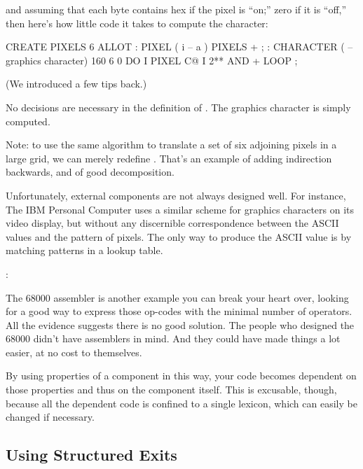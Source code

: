 \noindent and assuming that each byte contains hex  if the pixel is
``on;'' zero if it is ``off,'' then here's how little code it takes to
compute the character:

\begin{Code}
CREATE PIXELS  6 ALLOT
: PIXEL  ( i -- a )  PIXELS + ;
: CHARACTER  ( -- graphics character)
   160   6 0 DO  I PIXEL C@  I 2** AND  +  LOOP ;
\end{Code}
(We introduced  a few tips back.)

No decisions are necessary in the definition of . The
graphics character is simply computed.

Note: to use the same algorithm to translate a set of six adjoining
pixels in a large grid, we can merely redefine . That's an example
of adding indirection backwards, and of good decomposition.

Unfortunately, external components are not always designed well.
For instance, The IBM Personal Computer uses a similar scheme for
graphics characters on its video display, but without any discernible
correspondence between the ASCII values and the pattern of pixels. The
only way to produce the ASCII value is by matching patterns in a lookup
table.

\begin{interview}
:
\begin{tfquot}
The 68000 assembler is another example you can break your heart over,
looking for a good way to express those op-codes with the minimal number
of operators. All the evidence suggests there is no good solution. The
people who designed the 68000 didn't have assemblers in mind. And they
could have made things a lot easier, at no cost to themselves.
\end{tfquot}
\end{interview}
By using properties of a component in this way, your code becomes
dependent on those properties and thus on the component itself. This is
excusable, though, because all the dependent code is confined to a single
lexicon, which can easily be changed if necessary.%
%

\subsection{Using Structured Exits}%
%

